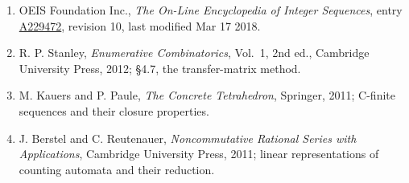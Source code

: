 \documentclass[11pt]{article}
\theoremstyle{definition}
\begin{document}
\begin{enumerate}

\item OEIS Foundation Inc., \emph{The On-Line Encyclopedia of Integer Sequences}, entry \href{https://oeis.org/A229472}{A229472}, revision 10, last modified Mar 17 2018.

\item R. P. Stanley, \emph{Enumerative Combinatorics}, Vol.~1, 2nd ed., Cambridge University Press, 2012; \S4.7, the transfer-matrix method.

\item M. Kauers and P. Paule, \emph{The Concrete Tetrahedron}, Springer, 2011; C-finite sequences and their closure properties.

\item J. Berstel and C. Reutenauer, \emph{Noncommutative Rational Series with Applications}, Cambridge University Press, 2011; linear representations of counting automata and their reduction.

\end{enumerate}
\end{document}
